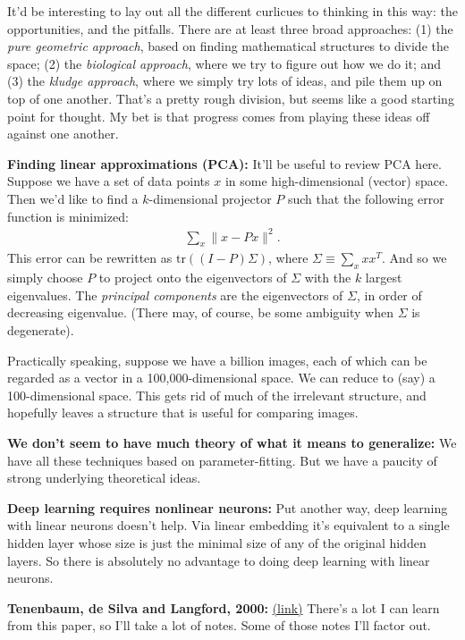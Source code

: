 \documentclass[12pt]{article}
\newcommand{\link}[2]{\href{#1}{#2}}
\begin{document}
It'd be interesting to lay out all the different curlicues to thinking
in this way: the opportunities, and the pitfalls.  There are at least
three broad approaches: (1) the \emph{pure geometric approach}, based
on finding mathematical structures to divide the space; (2) the
\emph{biological approach}, where we try to figure out how we do it;
and (3) the \emph{kludge approach}, where we simply try lots of ideas,
and pile them up on top of one another.  That's a pretty rough
division, but seems like a good starting point for thought.  My bet is
that progress comes from playing these ideas off against one another.

\textbf{Finding linear approximations (PCA):} It'll be useful to
review PCA here.  Suppose we have a set of data points $x$ in some
high-dimensional (vector) space.  Then we'd like to find a
$k$-dimensional projector $P$ such that the following error function
is minimized:
\begin{eqnarray}
\sum_x \| x-Px \|^2.
\end{eqnarray}
This error can be rewritten as $\mbox{tr}((I-P)\Sigma)$, where $\Sigma
\equiv \sum_x x x^T$.  And so we simply choose $P$ to project onto the
eigenvectors of $\Sigma$ with the $k$ largest eigenvalues.  The
\emph{principal components} are the eigenvectors of $\Sigma$, in order
of decreasing eigenvalue.  (There may, of course, be some ambiguity
when $\Sigma$ is degenerate).

Practically speaking, suppose we have a billion images, each of which
can be regarded as a vector in a 100,000-dimensional space.  We can
reduce to (say) a 100-dimensional space.  This gets rid of much of the
irrelevant structure, and hopefully leaves a structure that is useful
for comparing images.

\textbf{We don't seem to have much theory of what it means to
  generalize:} We have all these techniques based on
parameter-fitting.  But we have a paucity of strong underlying
theoretical ideas.

\textbf{Deep learning requires nonlinear neurons:} Put another way,
deep learning with linear neurons doesn't help.  Via linear embedding
it's equivalent to a single hidden layer whose size is just the
minimal size of any of the original hidden layers.  So there is
absolutely no advantage to doing deep learning with linear neurons.

\textbf{Tenenbaum, de Silva and Langford, 2000:}
\link{http://scholar.google.ca/scholar?cluster=14602426245887619907&hl=en&as_sdt=0,5}{(link)}
There's a lot I can learn from this paper, so I'll take a lot of
notes.  Some of those notes I'll factor out.  
\end{document}
